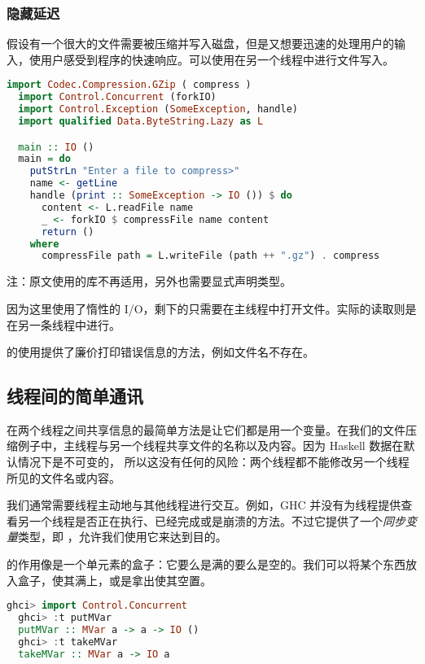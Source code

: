 \documentclass[./main.tex]{subfiles}
\begin{document}
\subsubsection*{隐藏延迟}

假设有一个很大的文件需要被压缩并写入磁盘，但是又想要迅速的处理用户的输入，使用户感受到程序的快速响应。可以使用在另一个线程中进行文件写入。

\begin{lstlisting}[language=Haskell]
  import Codec.Compression.GZip ( compress )
  import Control.Concurrent (forkIO)
  import Control.Exception (SomeException, handle)
  import qualified Data.ByteString.Lazy as L

  main :: IO ()
  main = do
    putStrLn "Enter a file to compress>"
    name <- getLine
    handle (print :: SomeException -> IO ()) $ do
      content <- L.readFile name
      _ <- forkIO $ compressFile name content
      return ()
    where
      compressFile path = L.writeFile (path ++ ".gz") . compress
\end{lstlisting}

注：原文使用的库不再适用，另外也需要显式声明类型。

因为这里使用了惰性的 I/O，剩下的只需要在主线程中打开文件。实际的读取则是在另一条线程中进行。

的使用提供了廉价打印错误信息的方法，例如文件名不存在。

\subsection*{线程间的简单通讯}

在两个线程之间共享信息的最简单方法是让它们都是用一个变量。在我们的文件压缩例子中，主线程与另一个线程共享文件的名称以及内容。因为 Haskell 数据在默认情况下是不可变的，
所以这没有任何的风险：两个线程都不能修改另一个线程所见的文件名或内容。

我们通常需要线程主动地与其他线程进行交互。例如，GHC 并没有为线程提供查看另一个线程是否正在执行、已经完成或是崩溃的方法。不过它提供了一个\textit{同步变量}类型，即
，允许我们使用它来达到目的。

的作用像是一个单元素的盒子：它要么是满的要么是空的。我们可以将某个东西放入盒子，使其满上，或是拿出使其空置。

\begin{lstlisting}[language=Haskell]
  ghci> import Control.Concurrent
  ghci> :t putMVar
  putMVar :: MVar a -> a -> IO ()
  ghci> :t takeMVar
  takeMVar :: MVar a -> IO a
\end{lstlisting}
\end{document}
